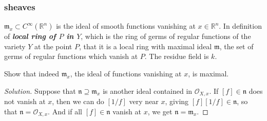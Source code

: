 \subsubsection{sheaves}

\(\mathfrak{m}_x \subset C^\infty(\mathbb{R}^n)\) is the ideal of smooth functions vanishing at \(x \in \mathbb{R}^n\). In \cite{hart} definition of \textit{\textbf{local ring of \(P\) in \(Y\)}}, which is the ring of germs of regular functions of the variety \(Y\) at the point \(P\), that it is a local ring with maximal ideal \(\mathfrak{m}\), the set of germs of regular functions which vanish at \(P\). The residue field is \(k\).

\begin{exercise}\leavevmode
Show that indeed \(\mathfrak{m}_x\), the ideal of functions vanishing at \(x\), is maximal.
\end{exercise}
\begin{proof}[Solution]\leavevmode
	Suppose that \(\mathfrak{n} \supseteq \mathfrak{m}_x\) is another ideal contained in \(\mathcal{O}_{X,x}\). If \([f] \in \mathfrak{n}\) does not vanish at \(x\), then we can do \([1/f]\) very near  \(x\), giving \([f][1/f] \in \mathfrak{n}\), so that \(\mathfrak{n}=\mathcal{O}_{X,x}\). And if all \([f] \in \mathfrak{n}\) vanish at \(x\), we get \(\mathfrak{n}=\mathfrak{m}_x\).
\end{proof}

